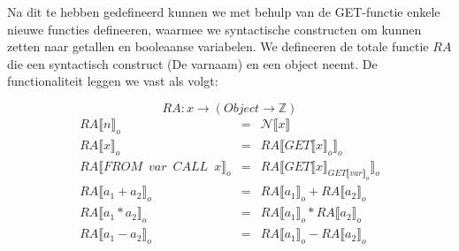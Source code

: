 \documentclass[12pt]{article}
\begin{document}
Na dit te hebben gedefineerd kunnen we met behulp van de GET-functie enkele nieuwe functies defineeren, waarmee we syntactische constructen om kunnen zetten naar getallen en booleaanse variabelen. We defineeren de totale functie $ RA $ die een syntactisch construct (De varnaam) en een object neemt. De functionaliteit leggen we vast als volgt:

\[ RA: x \rightarrow (Object \rightarrow \mathds{Z} ) \]
\[
\begin{matrix}
RA\llbracket n \rrbracket_o & = & \mathcal{N}\llbracket x \rrbracket\\
RA\llbracket x \rrbracket_o & = & RA\llbracket GET\llbracket x \rrbracket_o \rrbracket_o\\
RA\llbracket FROM \enspace var \enspace CALL \enspace x \rrbracket_o & = & RA\llbracket GET\llbracket x \rrbracket_{GET\llbracket var \rrbracket_o} \rrbracket_o\\
RA\llbracket a_1 + a_2 \rrbracket_o & = & RA\llbracket a_1 \rrbracket_o + RA\llbracket a_2 \rrbracket_o\\
RA\llbracket a_1 * a_2 \rrbracket_o & = & RA\llbracket a_1 \rrbracket_o * RA\llbracket a_2 \rrbracket_o\\
RA\llbracket a_1 - a_2 \rrbracket_o & = & RA\llbracket a_1 \rrbracket_o - RA\llbracket a_2 \rrbracket_o\\
\end{matrix}
\]
\end{document}
